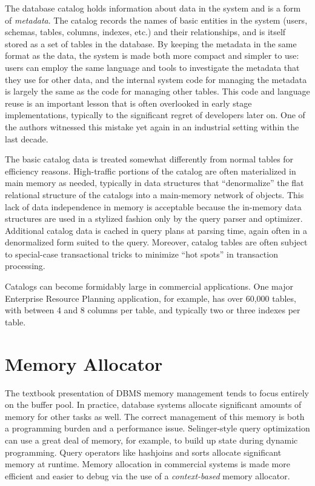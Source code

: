 \documentclass[b5paper,11pt,twoside,openright]{book}
\begin{document}
The database catalog holds information about data in the system and is a
form of \emph{metadata}. The catalog records the names of basic entities
in the system (users, schemas, tables, columns, indexes, etc.) and their
relationships, and is itself stored as a set of tables in the database.
By keeping the metadata in the same format as the data, the system is
made both more compact and simpler to use: users can employ the same
language and tools to investigate the metadata that they use for other
data, and the internal system code for managing the metadata is largely
the same as the code for managing other tables. This code and language
reuse is an important lesson that is often overlooked in early stage
implementations, typically to the significant regret of developers later
on. One of the authors witnessed this mistake yet again in an industrial
setting within the last decade.

The basic catalog data is treated somewhat differently from normal
tables for efficiency reasons. High-traffic portions of the catalog are
often materialized in main memory as needed, typically in data
structures that ``denormalize'' the flat relational structure of the
catalogs into a main-memory network of objects. This lack of data
independence in memory is acceptable because the in-memory data
structures are used in a stylized fashion only by the query parser and
optimizer. Additional catalog data is cached in query plans at parsing
time, again often in a denormalized form suited to the query. Moreover,
catalog tables are often subject to special-case transactional tricks to
minimize ``hot spots'' in transaction processing.

Catalogs can become formidably large in commercial applications. One
major Enterprise Resource Planning application, for example, has over
60,000 tables, with between 4 and 8 columns per table, and typically two
or three indexes per table.

\hypertarget{memory-allocator}{%
\section{Memory Allocator}\label{memory-allocator}}

The textbook presentation of DBMS memory management tends to focus
entirely on the buffer pool. In practice, database systems allocate
significant amounts of memory for other tasks as well. The correct
management of this memory is both a programming burden and a performance
issue. Selinger-style query optimization can use a great deal of memory,
for example, to build up state during dynamic programming. Query
operators like hashjoins and sorts allocate significant memory at
runtime. Memory allocation in commercial systems is made more efficient
and easier to debug via the use of a \emph{context-based} memory
allocator.
\end{document}
